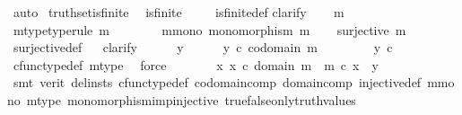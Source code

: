 \begin{isabellebody}
\ auto%
\endisatagproof
{\isafoldproof}%
%
\isadelimproof
\isanewline
%
\endisadelimproof
\isanewline
{}\isamarkupfalse%
\ truth{\isacharunderscore}{\kern0pt}set{\isacharunderscore}{\kern0pt}is{\isacharunderscore}{\kern0pt}finite{\isacharcolon}{\kern0pt}\isanewline
\ \ {\isachardoublequoteopen}is{\isacharunderscore}{\kern0pt}finite\ {\isasymOmega}{\isachardoublequoteclose}\isanewline
%
\isadelimproof
\ \ %
\endisadelimproof
%
\isatagproof
{}\isamarkupfalse%
\ is{\isacharunderscore}{\kern0pt}finite{\isacharunderscore}{\kern0pt}def\isanewline
{}\isamarkupfalse%
{\isacharparenleft}{\kern0pt}clarify{\isacharparenright}{\kern0pt}\isanewline
\ \ \isamarkupfalse%
\ m\ \isanewline
\ \ \isamarkupfalse%
\ m{\isacharunderscore}{\kern0pt}type{\isacharbrackleft}{\kern0pt}type{\isacharunderscore}{\kern0pt}rule{\isacharbrackright}{\kern0pt}{\isacharcolon}{\kern0pt}\ {\isachardoublequoteopen}m\ {\isacharcolon}{\kern0pt}\ {\isasymOmega}\ {\isasymrightarrow}\ {\isasymOmega}{\isachardoublequoteclose}\isanewline
\ \ \isamarkupfalse%
\ m{\isacharunderscore}{\kern0pt}mono{\isacharcolon}{\kern0pt}\ {\isachardoublequoteopen}monomorphism\ m{\isachardoublequoteclose}\isanewline
\ \ \isamarkupfalse%
\ {\isachardoublequoteopen}surjective\ m{\isachardoublequoteclose}\isanewline
\ \ \ \ \isamarkupfalse%
\ surjective{\isacharunderscore}{\kern0pt}def\isanewline
\ \ \isamarkupfalse%
{\isacharparenleft}{\kern0pt}clarify{\isacharparenright}{\kern0pt}\isanewline
\ \ \ \ \isamarkupfalse%
\ y\isanewline
\ \ \ \ \isamarkupfalse%
\ {\isachardoublequoteopen}y\ {\isasymin}\isactrlsub c\ codomain\ m{\isachardoublequoteclose}\ \isanewline
\ \ \ \ \isamarkupfalse%
\ \isamarkupfalse%
\ {\isachardoublequoteopen}y\ {\isasymin}\isactrlsub c\ {\isasymOmega}{\isachardoublequoteclose}\isanewline
\ \ \ \ \ \ \isamarkupfalse%
\ cfunc{\isacharunderscore}{\kern0pt}type{\isacharunderscore}{\kern0pt}def\ m{\isacharunderscore}{\kern0pt}type\ \isamarkupfalse%
\ force\isanewline
\ \ \ \ \isamarkupfalse%
\ \isamarkupfalse%
\ {\isachardoublequoteopen}{\isasymexists}x{\isachardot}{\kern0pt}\ x\ {\isasymin}\isactrlsub c\ domain\ m\ {\isasymand}\ m\ {\isasymcirc}\isactrlsub c\ x\ {\isacharequal}{\kern0pt}\ y{\isachardoublequoteclose}\isanewline
\ \ \ \ \ \ \isamarkupfalse%
\ {\isacharparenleft}{\kern0pt}smt\ {\isacharparenleft}{\kern0pt}verit{\isacharcomma}{\kern0pt}\ del{\isacharunderscore}{\kern0pt}insts{\isacharparenright}{\kern0pt}\ cfunc{\isacharunderscore}{\kern0pt}type{\isacharunderscore}{\kern0pt}def\ codomain{\isacharunderscore}{\kern0pt}comp\ domain{\isacharunderscore}{\kern0pt}comp\ injective{\isacharunderscore}{\kern0pt}def\ m{\isacharunderscore}{\kern0pt}mono\ m{\isacharunderscore}{\kern0pt}type\ monomorphism{\isacharunderscore}{\kern0pt}imp{\isacharunderscore}{\kern0pt}injective\ true{\isacharunderscore}{\kern0pt}false{\isacharunderscore}{\kern0pt}only{\isacharunderscore}{\kern0pt}truth{\isacharunderscore}{\kern0pt}values{\isacharparenright}{\kern0pt}\isanewline

\end{isabellebody}
